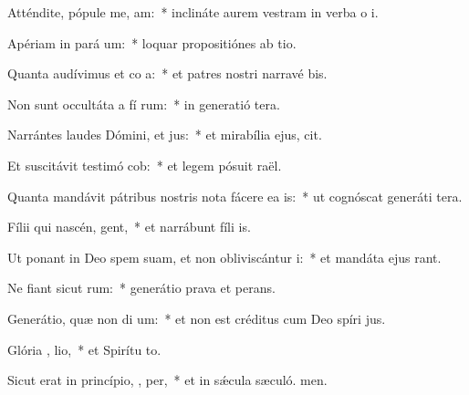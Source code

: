 \item Atténdite, pópule me,  am:~* inclináte aurem vestram in verba o i.
\item Apériam in pará  um:~* loquar propositiónes ab tio.
\item Quanta audívimus et co a:~* et patres nostri narravé bis.
\item Non sunt occultáta a fí rum:~* in generatió tera.
\item Narrántes laudes Dómini, et  jus:~* et mirabília ejus,  cit.
\item Et suscitávit testimó  cob:~* et legem pósuit  raël.
\item Quanta mandávit pátribus nostris nota fácere ea  is:~* ut cognóscat generáti tera.
\item Fílii qui nascén,  gent,~* et narrábunt fíli is.
\item Ut ponant in Deo spem suam, et non obliviscántur  i:~* et mandáta ejus rant.
\item Ne fiant sicut  rum:~* generátio prava et perans.
\item Generátio, quæ non di  um:~* et non est créditus cum Deo spíri jus.
\item Glória ,  lio,~* et Spirítu to.
\item Sicut erat in princípio,  ,  per,~* et in sǽcula sæculó. men.
